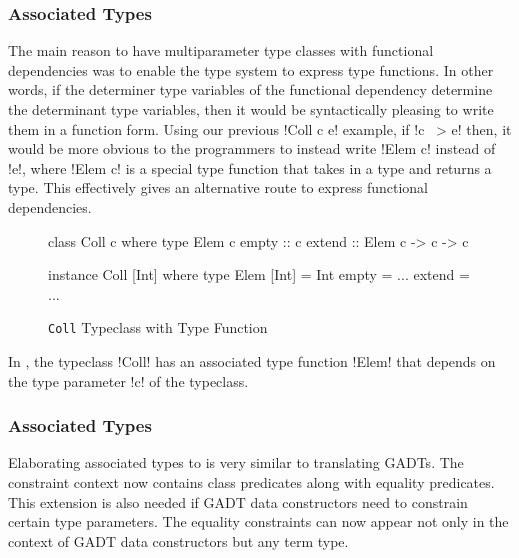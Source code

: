 \documentclass[manuscript,screen,nonacm]{acmart}
\begin{document}
\subsubsection{Associated Types}
The main reason to have multiparameter type classes with functional dependencies was to enable the type system to express type functions. In other words, if the determiner type variables of the functional dependency determine the determinant type variables, then it would be syntactically pleasing to write them in a function form.
Using our previous !Coll c e! example, if !c ~> e! then, it would be more obvious to the programmers to instead write !Elem c! instead of !e!, where !Elem c! is a special type function that takes in a type and returns a type. This effectively gives an alternative route to express functional dependencies.
\begin{figure}[ht]
  \begin{center}
    \begin{minipage}[ht]{0.4\linewidth}
      \begin{code}
        class Coll c where
           type Elem c
           empty :: c
           extend :: Elem c -> c -> c
      \end{code}
    \end{minipage}%
    \begin{minipage}[ht]{0.4\linewidth}
      \begin{code}
        instance Coll [Int] where
           type Elem [Int] = Int
           empty = ...
           extend = ...
      \end{code}
    \end{minipage}
  \end{center}
  \caption[Coll typeclass]{\lstinline{Coll} Typeclass with Type Function}
  \label{fig:type-fam}
\end{figure}

In , the typeclass !Coll! has an associated type function !Elem! that depends on the type parameter !c! of the typeclass.

\subsubsection{Associated Types}
Elaborating associated types to \SFC is very similar to translating GADTs. The constraint context now contains class predicates along with equality predicates. This extension is also needed if GADT data constructors need to constrain certain type parameters. The equality constraints can now appear not only in the context of GADT data constructors but any term type.
\end{document}
